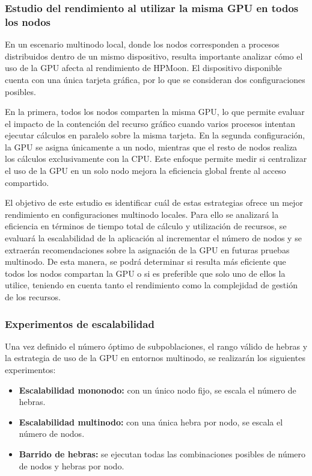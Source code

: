 \subsubsection{Estudio del rendimiento al utilizar la misma GPU en todos los nodos}

En un escenario multinodo local, donde los nodos corresponden a procesos distribuidos dentro de un mismo dispositivo, resulta importante analizar cómo el uso de la GPU afecta al rendimiento de HPMoon. El dispositivo disponible cuenta con una única tarjeta gráfica, por lo que se consideran dos configuraciones posibles.

En la primera, todos los nodos comparten la misma GPU, lo que permite evaluar el impacto de la contención del recurso gráfico cuando varios procesos intentan ejecutar cálculos en paralelo sobre la misma tarjeta. En la segunda configuración, la GPU se asigna únicamente a un nodo, mientras que el resto de nodos realiza los cálculos exclusivamente con la CPU. Este enfoque permite medir si centralizar el uso de la GPU en un solo nodo mejora la eficiencia global frente al acceso compartido.

El objetivo de este estudio es identificar cuál de estas estrategias ofrece un mejor rendimiento en configuraciones multinodo locales. Para ello se analizará la eficiencia en términos de tiempo total de cálculo y utilización de recursos, se evaluará la escalabilidad de la aplicación al incrementar el número de nodos y se extraerán recomendaciones sobre la asignación de la GPU en futuras pruebas multinodo. De esta manera, se podrá determinar si resulta más eficiente que todos los nodos compartan la GPU o si es preferible que solo uno de ellos la utilice, teniendo en cuenta tanto el rendimiento como la complejidad de gestión de los recursos.

\subsubsection{Experimentos de escalabilidad}

Una vez definido el número óptimo de subpoblaciones, el rango válido de hebras y la estrategia de uso de la GPU en entornos multinodo, se realizarán los siguientes experimentos:

\begin{itemize}
    \item \textbf{Escalabilidad mononodo:} con un único nodo fijo, se escala el número de hebras.
    \item \textbf{Escalabilidad multinodo:} con una única hebra por nodo, se escala el número de nodos.
    \item \textbf{Barrido de hebras:} se ejecutan todas las combinaciones posibles de número de nodos y hebras por nodo.
\end{itemize}

